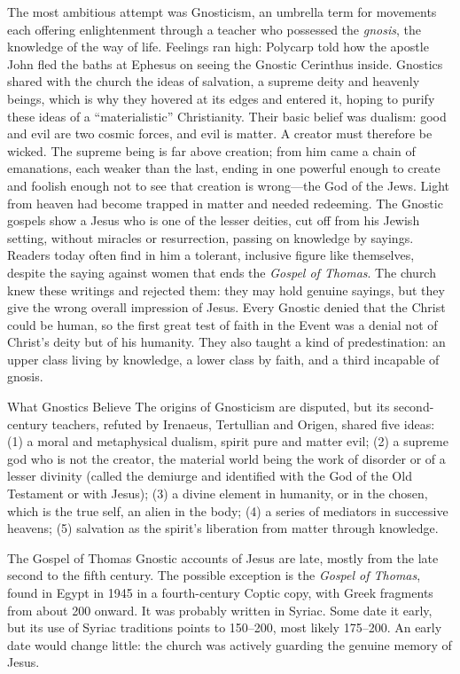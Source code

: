 The most ambitious attempt was Gnosticism, an umbrella term for movements each offering
enlightenment through a teacher who possessed the \emph{gnosis}, the knowledge of the way of life.
Feelings ran high: Polycarp told how the apostle John fled the baths at Ephesus on seeing the Gnostic
Cerinthus inside. Gnostics shared with the church the ideas of salvation, a supreme deity and
heavenly beings, which is why they hovered at its edges and entered it, hoping to purify these ideas
of a ``materialistic'' Christianity. Their basic belief was dualism: good and evil are two cosmic
forces, and evil is matter. A creator must therefore be wicked. The supreme being is far above
creation; from him came a chain of emanations, each weaker than the last, ending in one powerful
enough to create and foolish enough not to see that creation is wrong---the God of the Jews. Light
from heaven had become trapped in matter and needed redeeming. The Gnostic gospels show a Jesus who
is one of the lesser deities, cut off from his Jewish setting, without miracles or resurrection,
passing on knowledge by sayings. Readers today often find in him a tolerant, inclusive figure like
themselves, despite the saying against women that ends the \emph{Gospel of Thomas}. The church knew
these writings and rejected them: they may hold genuine sayings, but they give the wrong overall
impression of Jesus. Every Gnostic denied that the Christ could be human, so the first great test
of faith in the Event was a denial not of Christ's deity but of his humanity. They also taught a kind
of predestination: an upper class living by knowledge, a lower class by faith, and a third incapable
of gnosis.

\begin{sidebox}{What Gnostics Believe}
The origins of Gnosticism are disputed, but its second-century teachers, refuted by Irenaeus,
Tertullian and Origen, shared five ideas: (1) a moral and metaphysical dualism, spirit pure and matter
evil; (2) a supreme god who is not the creator, the material world being the work of disorder or of a lesser divinity (called the demiurge and identified with the God of the Old Testament or with Jesus); (3) a divine element in humanity, or in
the chosen, which is the true self, an alien in the body; (4) a series of mediators in successive
heavens; (5) salvation as the spirit's liberation from matter through knowledge.
\end{sidebox}

\begin{sidebox}{The Gospel of Thomas}
Gnostic accounts of Jesus are late, mostly from the late second to the fifth century. The possible
exception is the \emph{Gospel of Thomas}, found in Egypt in 1945 in a fourth-century Coptic copy, with
Greek fragments from about 200 onward. It was probably written in Syriac. Some date it early, but its
use of Syriac traditions points to 150--200, most likely 175--200. An early date would change little:
the church was actively guarding the genuine memory of Jesus.
\end{sidebox}

